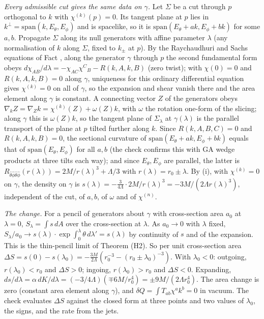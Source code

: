 \emph{Every admissible cut gives the same data on $\gamma$.} Let $\Sigma$ be a cut through $p$ orthogonal to $k$ with $\chi^{(k)}(p) = 0$. Its tangent plane at $p$ lies in $k^{\perp} = \mathrm{span}(k, E_{\theta}, E_{\phi})$ and is spacelike, so it is $\mathrm{span}(E_{\theta} + a k, E_{\phi} + b k)$ for some $a, b$. Propagate $\Sigma$ along its null generators with affine parameter $\lambda$ (any normalisation of $k$ along $\Sigma$, fixed to $k_{\pm}$ at $p$). By the Raychaudhuri and Sachs equations of Fact , along the generator $\gamma$ through $p$ the second fundamental form obeys $d\chi_{AB}/d\lambda = -\chi_{AC}\chi^{C}{}_{B} - R(k, A, k, B)$ (zero twist); with $\chi(0) = 0$ and $R(k, A, k, B) = 0$ along $\gamma$, uniqueness for this ordinary differential equation gives $\chi^{(k)} = 0$ on all of $\gamma$, so the expansion and shear vanish there and the area element along $\gamma$ is constant. A connecting vector $Z$ of the generators obeys $\nabla_{k}Z = \nabla_{Z}k = \chi^{(k)}(Z) + \omega(Z)k$, with $\omega$ the rotation one-form of the slicing; along $\gamma$ this is $\omega(Z)k$, so the tangent plane of $\Sigma_{\lambda}$ at $\gamma(\lambda)$ is the parallel transport of the plane at $p$ tilted further along $k$. Since $R(k, A, B, C) = 0$ and $R(k, A, k, B) = 0$, the sectional curvature of $\mathrm{span}(E_{\theta} + a k, E_{\phi} + b k)$ equals that of $\mathrm{span}(E_{\theta}, E_{\phi})$ for all $a, b$ (the check confirms this with GA wedge products at three tilts each way); and since $E_{\theta}, E_{\phi}$ are parallel, the latter is $R_{\hat\theta\hat\phi\hat\theta\hat\phi}(r(\lambda)) = 2M/r(\lambda)^{3} + \Lambda/3$ with $r(\lambda) = r_{0} \pm \lambda$. By (i), with $\chi^{(k)} = 0$ on $\gamma$, the density on $\gamma$ is $s(\lambda) = -\tfrac{3}{4\Lambda}\cdot 2M/r(\lambda)^{3} = -3M/(2\Lambda r(\lambda)^{3})$, independent of the cut, of $a, b$, of $\omega$ and of $\chi^{(n)}$.

\emph{The change.} For a pencil of generators about $\gamma$ with cross-section area $a_{0}$ at $\lambda = 0$, $S_{\lambda} = \int s\,dA$ over the cross-section at $\lambda$. As $a_{0} \to 0$ with $\lambda$ fixed, $S_{\lambda}/a_{0} \to s(\lambda)\cdot\exp\int_{0}^{\lambda}\theta\,d\lambda' = s(\lambda)$ by continuity of $s$ and of the expansion. This is the thin-pencil limit of Theorem (H2). So per unit cross-section area $\Delta S = s(0) - s(\lambda_{0}) = -\tfrac{3M}{2\Lambda}(r_{0}^{-3} - (r_{0} \pm \lambda_{0})^{-3})$. With $\lambda_{0} < 0$: outgoing, $r(\lambda_{0}) < r_{0}$ and $\Delta S > 0$; ingoing, $r(\lambda_{0}) > r_{0}$ and $\Delta S < 0$. Expanding, $ds/d\lambda = \alpha\,dK/d\lambda = (-3/4\Lambda)(\mp 6M/r_{0}^{4}) = \pm 9M/(2\Lambda r_{0}^{4})$. The area change is zero (constant area element along $\gamma$), and $\delta Q = \int T_{ab}\chi^{a}k^{b} = 0$ in vacuum. The check evaluates $\Delta S$ against the closed form at three points and two values of $\lambda_{0}$, the signs, and the rate from the jets.


